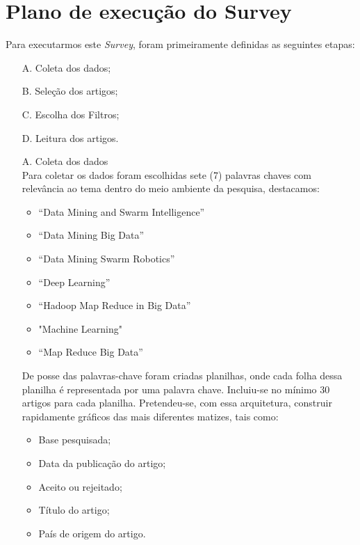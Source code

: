 \documentclass[conference,compsoc]{IEEEtran}
\begin{document}
\section{Plano de execução do Survey}

Para executarmos este \textit{Survey}, foram primeiramente definidas as seguintes etapas:

\begin{enumerate}
 \item[A.] Coleta dos dados;
 \item[B.] Seleção dos artigos; 
 \item[C.] Escolha dos Filtros;
 \item[D.] Leitura dos artigos.
\end{enumerate}

\begin{enumerate}
 \item[A.] Coleta dos dados\\
 Para coletar os dados foram escolhidas sete (7) palavras chaves com relevância ao tema dentro do meio ambiente da pesquisa, destacamos:
  \begin{itemize}
    \item “Data Mining and Swarm Intelligence”
    \item “Data Mining Big Data”
    \item “Data Mining Swarm Robotics”
    \item “Deep Learning”
	\item “Hadoop Map Reduce in Big Data”    
    \item "Machine Learning"
    \item “Map Reduce Big Data”
  \end{itemize}


 De posse das palavras-chave foram criadas planilhas, onde cada folha dessa planilha é representada por uma palavra chave. 
 Incluiu-se no mínimo 30 artigos para cada planilha. 
 Pretendeu-se, com essa arquitetura, construir rapidamente gráficos das mais diferentes matizes, tais como:
  \begin{itemize}
    \item Base pesquisada;
    \item Data da publicação do artigo;
    \item Aceito ou rejeitado;
    \item Título do artigo;
    \item País de origem do artigo.
  \end{itemize}


\end{enumerate}
\end{document}

